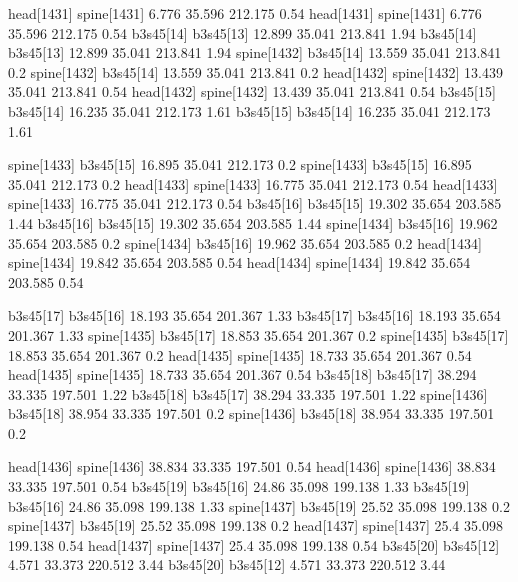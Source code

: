 head[1431]    spine[1431]    6.776    35.596    212.175    0.54
head[1431]    spine[1431]    6.776    35.596    212.175    0.54
b3s45[14]    b3s45[13]    12.899    35.041    213.841    1.94
b3s45[14]    b3s45[13]    12.899    35.041    213.841    1.94
spine[1432]    b3s45[14]    13.559    35.041    213.841    0.2
spine[1432]    b3s45[14]    13.559    35.041    213.841    0.2
head[1432]    spine[1432]    13.439    35.041    213.841    0.54
head[1432]    spine[1432]    13.439    35.041    213.841    0.54
b3s45[15]    b3s45[14]    16.235    35.041    212.173    1.61
b3s45[15]    b3s45[14]    16.235    35.041    212.173    1.61


spine[1433]    b3s45[15]    16.895    35.041    212.173    0.2
spine[1433]    b3s45[15]    16.895    35.041    212.173    0.2
head[1433]    spine[1433]    16.775    35.041    212.173    0.54
head[1433]    spine[1433]    16.775    35.041    212.173    0.54
b3s45[16]    b3s45[15]    19.302    35.654    203.585    1.44
b3s45[16]    b3s45[15]    19.302    35.654    203.585    1.44
spine[1434]    b3s45[16]    19.962    35.654    203.585    0.2
spine[1434]    b3s45[16]    19.962    35.654    203.585    0.2
head[1434]    spine[1434]    19.842    35.654    203.585    0.54
head[1434]    spine[1434]    19.842    35.654    203.585    0.54


b3s45[17]    b3s45[16]    18.193    35.654    201.367    1.33
b3s45[17]    b3s45[16]    18.193    35.654    201.367    1.33
spine[1435]    b3s45[17]    18.853    35.654    201.367    0.2
spine[1435]    b3s45[17]    18.853    35.654    201.367    0.2
head[1435]    spine[1435]    18.733    35.654    201.367    0.54
head[1435]    spine[1435]    18.733    35.654    201.367    0.54
b3s45[18]    b3s45[17]    38.294    33.335    197.501    1.22
b3s45[18]    b3s45[17]    38.294    33.335    197.501    1.22
spine[1436]    b3s45[18]    38.954    33.335    197.501    0.2
spine[1436]    b3s45[18]    38.954    33.335    197.501    0.2


head[1436]    spine[1436]    38.834    33.335    197.501    0.54
head[1436]    spine[1436]    38.834    33.335    197.501    0.54
b3s45[19]    b3s45[16]    24.86    35.098    199.138    1.33
b3s45[19]    b3s45[16]    24.86    35.098    199.138    1.33
spine[1437]    b3s45[19]    25.52    35.098    199.138    0.2
spine[1437]    b3s45[19]    25.52    35.098    199.138    0.2
head[1437]    spine[1437]    25.4    35.098    199.138    0.54
head[1437]    spine[1437]    25.4    35.098    199.138    0.54
b3s45[20]    b3s45[12]    4.571    33.373    220.512    3.44
b3s45[20]    b3s45[12]    4.571    33.373    220.512    3.44


